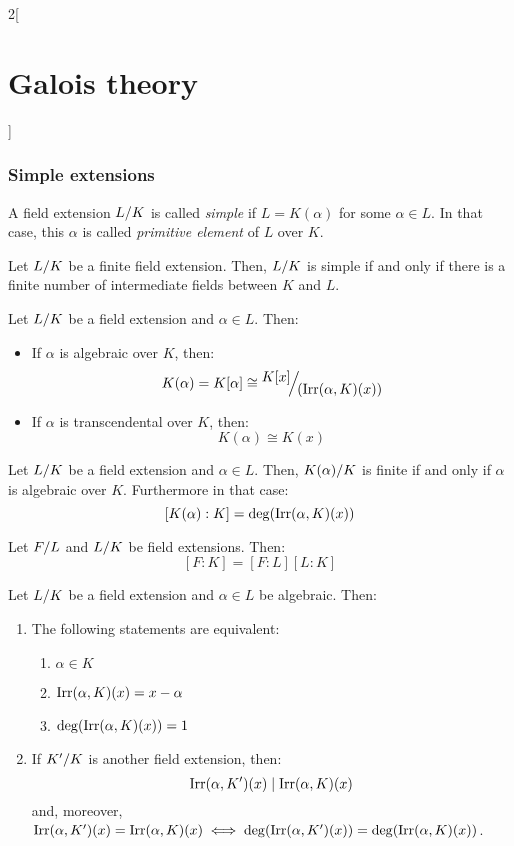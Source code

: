 \documentclass[../../../main.tex]{subfiles}
\begin{document}
\begin{multicols}{2}[\section{Galois theory}]
  \subsubsection{Simple extensions}
  \begin{definition}
    A field extension $\quot{L}{K}$ is called \emph{simple} if $L=K(\alpha)$ for some $\alpha\in L$. In that case, this $\alpha$ is called \emph{primitive element} of $L$ over $K$.
  \end{definition}
  \begin{theorem}
    Let $\quot{L}{K}$ be a finite field extension. Then, $\quot{L}{K}$ is simple if and only if there is a finite number of intermediate fields between $K$ and $L$.
  \end{theorem}
  \begin{prop}
    Let $\quot{L}{K}$ be a field extension and $\alpha\in L$. Then:
    \begin{itemize}
      \item If $\alpha$ is algebraic over $K$, then: $$K(\alpha)=K[\alpha]\cong\quot{K[x]}{(\irr(\alpha,K)(x))}$$
      \item If $\alpha$ is transcendental over $K$, then: $$K(\alpha)\cong K(x)$$
    \end{itemize}
  \end{prop}
  \begin{corollary}
    Let $\quot{L}{K}$ be a field extension and $\alpha\in L$. Then, $\quot{K(\alpha)}{K}$ is finite if and only if $\alpha$ is algebraic over $K$. Furthermore in that case: $$[K(\alpha):K]=\deg(\operatorname{Irr}(\alpha,K)(x))$$
  \end{corollary}
  \begin{theorem}
    Let $\quot{F}{L}$ and $\quot{L}{K}$ be field extensions. Then: $$[F:K]=[F:L][L:K]$$
  \end{theorem}
  \begin{prop}
    Let $\quot{L}{K}$ be a field extension and $\alpha\in L$ be algebraic. Then:
    \begin{enumerate}
      \item The following statements are equivalent:
            \begin{enumerate}
              \item $\alpha\in K$
              \item $\operatorname{Irr}(\alpha,K)(x)=x-\alpha$
              \item $\deg(\operatorname{Irr}(\alpha,K)(x))=1$
            \end{enumerate}
      \item If $\quot{K'}{K}$ is another field extension, then: $$\operatorname{Irr}(\alpha,K')(x)\mid\operatorname{Irr}(\alpha,K)(x)$$ and, moreover, $\operatorname{Irr}(\alpha,K')(x)=\operatorname{Irr}(\alpha,K)(x)\iff\deg(\operatorname{Irr}(\alpha,K')(x))=\deg(\operatorname{Irr}(\alpha,K)(x))$.

\end{enumerate}
\end{prop}
\end{multicols}
\end{document}
